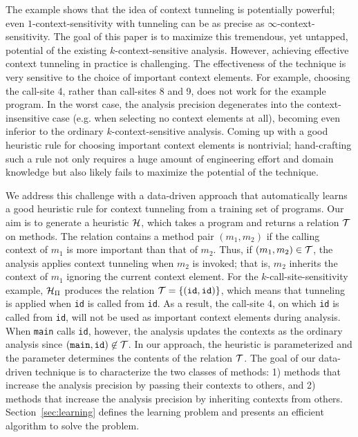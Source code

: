 The example shows that the idea of context tunneling is potentially
powerful; even $1$-context-sensitivity with
tunneling can be as precise as
$\infty$-context-sensitivity. The goal of this paper is to maximize
this tremendous, yet untapped, potential of the existing $k$-context-sensitive analysis.
However, achieving effective context tunneling in practice is
challenging. The effectiveness of the technique is very sensitive
to the choice of important context elements.  For example,
choosing the call-site 4, rather than call-sites 8 and 9, does not
work for the example program.  In the worst case, the analysis
precision degenerates into the context-insensitive case (e.g. when
selecting no context elements at all), becoming even inferior to the
ordinary
$k$-context-sensitive analysis.  Coming up with a good
heuristic rule for choosing important context elements is nontrivial;
hand-crafting such a rule not only requires a huge amount of
engineering effort and domain knowledge but also likely fails to
maximize the potential of the technique.




We address this challenge with a data-driven approach that
automatically learns a good heuristic rule for context tunneling from
a training set of programs.
Our aim is to generate a heuristic $\mathcal{H}$,
which takes a program and returns a relation $\mathcal{T}$ on methods.
The relation contains a method pair $(m_1, m_2)$ if the calling context of
$m_1$ is more important than that of $m_2$. Thus, if $(m_1, m_2) \in
\mathcal{T}$, the analysis applies context tunneling when $m_2$ is
invoked; that is, $m_2$ inherits the context of $m_1$ ignoring the current
context element. For the $k$-call-site-sensitivity example, $\mathcal{H}_\Pi$
produces the relation $\mathcal{T} = \{ ({\tt id}, {\tt id}) \}$,
which means that tunneling is applied when {\tt id} is called from {\tt id}.
As a result, the call-site 4, on which {\tt id} is called from {\tt id}, will
not be used as important context elements during analysis.  When {\tt main}
calls {\tt id}, however, the analysis updates the contexts as the ordinary
analysis since $({\tt main}, {\tt id}) \not\in \mathcal{T}$.  In our
approach, the heuristic is parameterized and the parameter determines the
contents of the relation $\mathcal{T}$.  The goal of our data-driven
technique is to characterize the two classes of methods: 1) methods that
increase the analysis precision by passing their contexts to others, and 2)
methods that increase the analysis precision by inheriting contexts from
others. Section~\ref{sec:learning} defines the learning problem and presents
an efficient algorithm to solve the problem.


